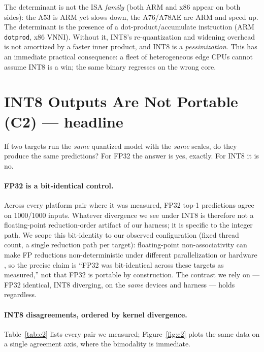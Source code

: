 \documentclass[11pt]{article}
\begin{document}
The determinant is not the ISA \emph{family} (both ARM and x86 appear on both sides): the A53 is ARM yet slows down, the A76/A78AE are ARM and speed up. The determinant is the presence of a dot-product/accumulate instruction (ARM \texttt{dotprod}, x86 VNNI). Without it, INT8's re-quantization and widening overhead is not amortized by a faster inner product, and INT8 is a \emph{pessimization}. This has an immediate practical consequence: a fleet of heterogeneous edge CPUs cannot assume INT8 is a win; the same binary regresses on the wrong core.

\section{INT8 Outputs Are Not Portable (C2) --- headline}

If two targets run the \emph{same} quantized model with the \emph{same} scales, do they produce the same predictions? For FP32 the answer is yes, exactly. For INT8 it is no.

\paragraph{FP32 is a bit-identical control.}
Across every platform pair where it was measured, FP32 top-1 predictions agree on 1000/1000 inputs. Whatever divergence we see under INT8 is therefore not a floating-point reduction-order artifact of our harness; it is specific to the integer path. We scope this bit-identity to our observed configuration (fixed thread count, a single reduction path per target): floating-point non-associativity can make FP reductions non-deterministic under different parallelization or hardware \citep{fpnonassoc2024}, so the precise claim is ``FP32 was bit-identical across these targets as measured,'' not that FP32 is portable by construction. The contrast we rely on --- FP32 identical, INT8 diverging, on the \emph{same} devices and harness --- holds regardless.

\paragraph{INT8 disagreements, ordered by kernel divergence.}
Table~\ref{tab:c2} lists every pair we measured; Figure~\ref{fig:c2} plots the same data on a single agreement axis, where the bimodality is immediate.
\end{document}
